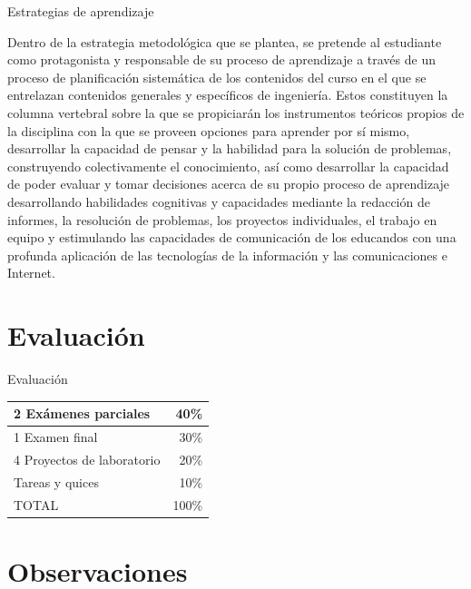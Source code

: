 \documentclass[handout,xcolor=dvipsnames]{beamer}
\newcommand{\pageframe}[1]{\frame{\begin{center}{ \Huge #1 }\end{center}}}
\begin{document}
\begin{frame}{Estrategias de aprendizaje} 

\begin{footnotesize}   Dentro de la estrategia metodológica que se plantea, se pretende al estudiante como protagonista y responsable de su proceso de aprendizaje a través de un proceso de planificación sistemática de los contenidos del curso en el que se entrelazan contenidos generales y específicos de ingeniería. Estos constituyen la  columna vertebral sobre la que se propiciarán los instrumentos teóricos propios de la disciplina con la que se proveen opciones para aprender por sí mismo, desarrollar la capacidad de pensar y la habilidad para la solución de problemas, construyendo colectivamente el conocimiento, así como desarrollar la capacidad de poder evaluar y tomar decisiones acerca de su propio proceso de aprendizaje desarrollando habilidades cognitivas y capacidades mediante la redacción de informes, la resolución de problemas, los proyectos individuales, el trabajo en equipo y estimulando las capacidades de comunicación de los educandos con una  profunda aplicación de las tecnologías de la información y las comunicaciones e Internet.
\end{footnotesize}
\end{frame}

  
\section{Evaluaci\'on}

\pageframe{Evaluación}

\begin{frame}{Evaluación}
\begin{center}
\begin{tabular}{|l|r|}\hline
	2 Exámenes parciales	&	40\%\\\hline
	1 Examen final		&	30\%\\\hline
	4 Proyectos de laboratorio &	20\%\\\hline
	Tareas y quices	&	10\%\\\hline\hline
	TOTAL			&	100\%\\\hline
\end{tabular}
\end{center}
\end{frame}

\section{Observaciones}
\end{document}
